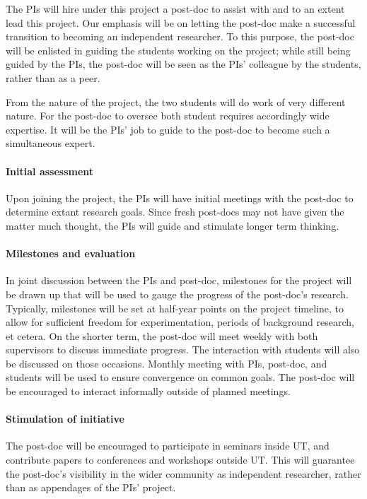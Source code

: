 The PIs will hire under this project
a post-doc to assist with and to an extent
lead this project. Our emphasis will be on 
letting the post-doc make a successful transition
to becoming an independent researcher. To this
purpose, the post-doc will be enlisted in guiding the students
working on the project; while still being guided by the PIs, the post-doc
will be seen as the PIs' colleague by the students, rather than as a peer.

From the nature of the project, the two students will 
do work of very different nature.
For the post-doc to oversee both student requires
accordingly wide expertise. 
It will be the PIs' job to guide to the post-doc to become
such a simultaneous expert.

\paragraph*{\bf Initial assessment} Upon joining the
project, the PIs will have initial meetings with the post-doc to determine 
extant research goals. Since fresh post-docs may not have given the matter
much thought, the PIs will guide and stimulate 
longer term thinking.

\paragraph*{\bf Milestones and evaluation} In joint discussion between
the PIs and post-doc, milestones for the project will be drawn up
that will be used to gauge the progress of the post-doc's
research. Typically, milestones will be set at half-year points on the
project timeline, to allow for sufficient freedom for 
experimentation, periods of background research, et cetera. On the
shorter term, the post-doc will meet weekly with both
supervisors to discuss immediate progress. The interaction with
students will also be discussed on those occasions. Monthly meeting
with PIs, post-doc, and students will be used to ensure convergence on
common goals. The post-doc will be encouraged to interact informally
outside of planned meetings.

\paragraph*{\bf Stimulation of initiative} The post-doc will be
encouraged to participate in seminars inside UT, and contribute papers
to conferences and workshops outside UT. This will guarantee 
the post-doc's
visibility in the wider community as independent researcher, rather
than as appendages of the PIs' project.

